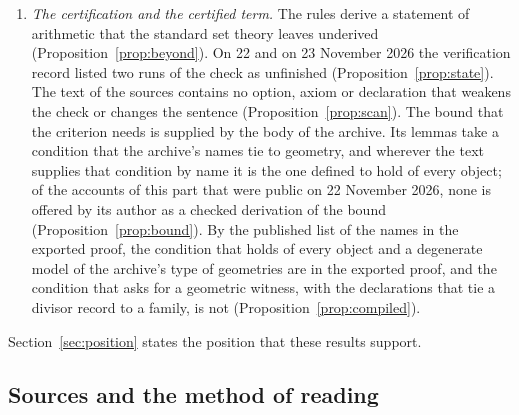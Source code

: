 \documentclass[11pt]{article}
\theoremstyle{definition}
\theoremstyle{remark}
\begin{document}
\begin{enumerate}[leftmargin=2em,itemsep=2pt]
\item \emph{The certification and the certified term.} The rules derive a statement of arithmetic that the standard set theory leaves underived (Proposition~\ref{prop:beyond}). On 22 and on 23 November 2026 the verification record listed two runs of the check as unfinished (Proposition~\ref{prop:state}). The text of the sources contains no option, axiom or declaration that weakens the check or changes the sentence (Proposition~\ref{prop:scan}). The bound that the criterion needs is supplied by the body of the archive. Its lemmas take a condition that the archive's names tie to geometry, and wherever the text supplies that condition by name it is the one defined to hold of every object; of the accounts of this part that were public on 22 November 2026, none is offered by its author as a checked derivation of the bound (Proposition~\ref{prop:bound}). By the published list of the names in the exported proof, the condition that holds of every object and a degenerate model of the archive's type of geometries are in the exported proof, and the condition that asks for a geometric witness, with the declarations that tie a divisor record to a family, is not (Proposition~\ref{prop:compiled}).
\end{enumerate}

\noindent Section~\ref{sec:position} states the position that these results support.


\subsection{Sources and the method of reading}\label{sec:method}
\end{document}
